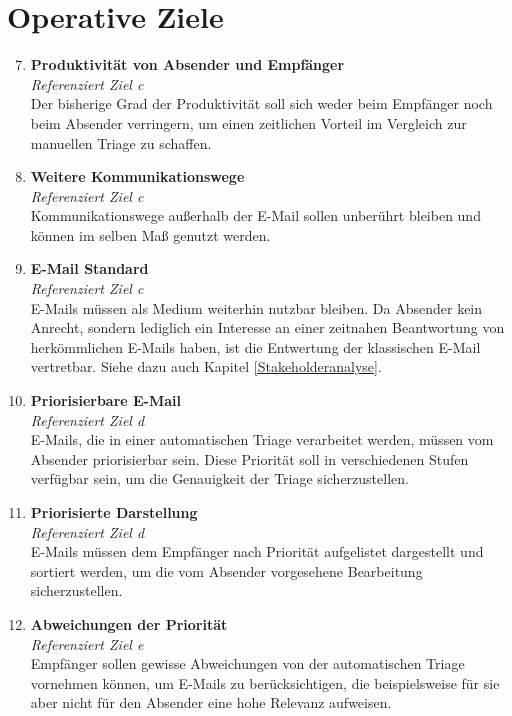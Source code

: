\section{Operative Ziele}
\label{Operative_Ziele}
\begin{enumerate}[label=(\alph*)]
\setcounter{enumi}{6}
    \item \textbf{Produktivität von Absender und Empfänger}\\
    \textit{Referenziert Ziel c} \\
        Der bisherige Grad der Produktivität soll sich weder beim Empfänger noch beim Absender verringern, um einen zeitlichen Vorteil im Vergleich zur manuellen Triage zu schaffen. 
        
    \item \textbf{Weitere Kommunikationswege}\\
    \textit{Referenziert Ziel c} \\
        Kommunikationswege außerhalb der E-Mail sollen unberührt bleiben und können im selben Maß genutzt werden. 
        
    \item \textbf{E-Mail Standard}\\
    \textit{Referenziert Ziel c} \\
        E-Mails müssen als Medium weiterhin nutzbar bleiben. Da Absender kein Anrecht, sondern lediglich ein Interesse an einer zeitnahen Beantwortung von herkömmlichen E-Mails haben, ist die Entwertung der klassischen E-Mail vertretbar. Siehe dazu auch Kapitel \ref{Stakeholderanalyse}.
    
    \item \textbf{Priorisierbare E-Mail}\\
    \textit{Referenziert Ziel d} \\
        E-Mails, die in einer automatischen Triage verarbeitet werden, müssen vom Absender priorisierbar sein. Diese Priorität soll in verschiedenen Stufen verfügbar sein, um die Genauigkeit der Triage sicherzustellen.
         
    \item \textbf{Priorisierte Darstellung}\\
    \textit{Referenziert Ziel d} \\
        E-Mails müssen dem Empfänger nach Priorität aufgelistet dargestellt und sortiert werden, um die vom Absender vorgesehene Bearbeitung sicherzustellen. 
        
    \item \textbf{Abweichungen der Priorität}\\
    \textit{Referenziert Ziel e} \\
        Empfänger sollen gewisse Abweichungen von der automatischen Triage vornehmen können, um E-Mails zu berücksichtigen, die beispielsweise für sie aber nicht für den Absender eine hohe Relevanz aufweisen.
        

\end{enumerate}
